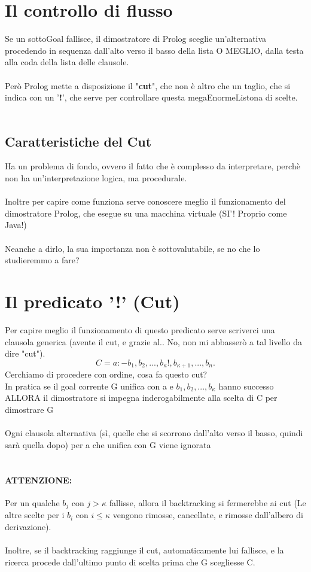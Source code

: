 \documentclass[12pt, a4paper, openany, oneside]{book}
\begin{document}
\section{Il controllo di flusso}
Se un sottoGoal fallisce, il dimostratore di Prolog sceglie un'alternativa 
procedendo in sequenza dall'alto verso il basso della lista O MEGLIO, dalla 
testa alla coda della lista delle clausole. \\ \\
Però Prolog mette a disposizione il "\textbf{cut}", che non è altro che un 
taglio, che si indica con un '\textbf{!}', che serve per controllare questa
megaEnormeListona di scelte.\\ \\
\subsection{Caratteristiche del Cut}
Ha un problema di fondo, ovvero il fatto che è complesso da interpretare, perchè
non ha un'interpretazione logica, ma procedurale. \\ \\
Inoltre per capire come funziona serve conoscere meglio il funzionamento del 
dimostratore Prolog, che esegue su una macchina virtuale (SI'! Proprio come Java!)
\\ \\
Neanche a dirlo, la sua importanza non è sottovalutabile, se no che lo 
studieremmo a fare?
\section{Il predicato '!' (Cut)}
Per capire meglio il funzionamento di questo predicato serve scriverci una
clausola generica (avente il cut, e grazie al.. No, non mi abbasserò a tal
livello da dire "cut"). 
\[
C = a :- b_{1}, b_{2}, ..., b_{\kappa} !, b_{\kappa + 1}, ..., b_{n}.
\] 
Cerchiamo di procedere con ordine, cosa fa questo cut?\\
In pratica se il goal corrente G unifica con a e $b_{1}, b_{2}, ..., b_{\kappa}$
hanno successo ALLORA il dimostratore 
si impegna inderogabilmente alla scelta di C per dimostrare G \\ \\
Ogni clausola alternativa (sì, quelle che si scorrono dall'alto verso il basso, 
quindi sarà quella dopo) per a che unifica con G viene ignorata\\ \\
\paragraph{ATTENZIONE: } Per un qualche $b_{j}$ con $j > \kappa$ fallisse, 
allora il backtracking si fermerebbe ai cut
(Le altre scelte per i $b_{i}$ con $i \leq \kappa$ vengono rimosse, cancellate,
e rimosse dall'albero di derivazione). \\ \\
Inoltre, se il backtracking raggiunge il cut, automaticamente lui fallisce, e la
ricerca procede dall'ultimo punto di scelta prima che G scegliesse C.
\end{document}
